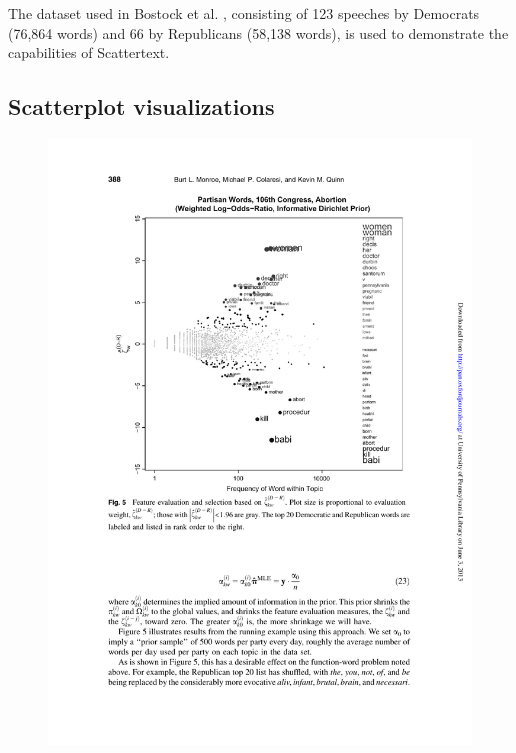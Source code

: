 \documentclass[11pt,a4paper]{article}
\begin{document}
The dataset used in Bostock et al. , consisting of 123 speeches by Democrats (76,864 words) and 66 by Republicans (58,138 words), is used to demonstrate the capabilities of Scattertext.  
\subsection{Scatterplot visualizations}
\begin{figure}[h] 
\includegraphics[width=\columnwidth]{monroefull}

\end{figure}
\end{document}
